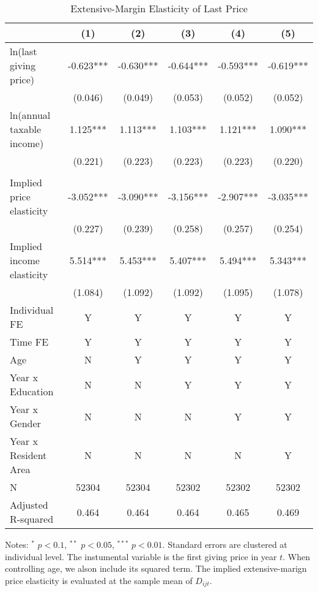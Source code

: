 \documentclass[
  11pt,
  a4paper,
]{article}
\begin{document}
\begin{table}

\caption{\label{tab:LastExtensive}Extensive-Margin Elasticity of Last Price}
\centering
\fontsize{7}{9}\selectfont
\begin{threeparttable}
\begin{tabular}[t]{lccccc}
\toprule
 & (1) & (2) & (3) & (4) & (5)\\
\midrule
ln(last giving price) & -0.623*** & -0.630*** & -0.644*** & -0.593*** & -0.619***\\
 & (0.046) & (0.049) & (0.053) & (0.052) & (0.052)\\
ln(annual taxable income) & 1.125*** & 1.113*** & 1.103*** & 1.121*** & 1.090***\\
 & (0.221) & (0.223) & (0.223) & (0.223) & (0.220)\\
 &  &  &  &  & \\
Implied price elasticity & -3.052*** & -3.090*** & -3.156*** & -2.907*** & -3.035***\\
 & (0.227) & (0.239) & (0.258) & (0.257) & (0.254)\\
Implied income elasticity & 5.514*** & 5.453*** & 5.407*** & 5.494*** & 5.343***\\
 & (1.084) & (1.092) & (1.092) & (1.095) & (1.078)\\
Individual FE & Y & Y & Y & Y & Y\\
Time FE & Y & Y & Y & Y & Y\\
Age & N & Y & Y & Y & Y\\
Year x Education & N & N & Y & Y & Y\\
Year x Gender & N & N & N & Y & Y\\
Year x Resident Area & N & N & N & N & Y\\
N & 52304 & 52304 & 52302 & 52302 & 52302\\
Adjusted R-squared & 0.464 & 0.464 & 0.464 & 0.465 & 0.469\\
\bottomrule
\end{tabular}
\begin{tablenotes}
\item Notes: $^{*}$ $p < 0.1$, $^{**}$ $p < 0.05$, $^{***}$ $p < 0.01$. Standard errors are clustered at individual level. The instumental variable is the first giving price in year $t$. When controlling age, we alson include its squared term. The implied extensive-marign price elasticity is evaluated at the sample mean of $D_{ijt}$.
\end{tablenotes}
\end{threeparttable}
\end{table}
\end{document}
